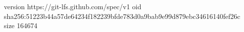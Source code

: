 version https://git-lfs.github.com/spec/v1
oid sha256:51223b44a57de64234f182239bfde783d0a9bab9e99d879ebc34616140fef26c
size 164674
